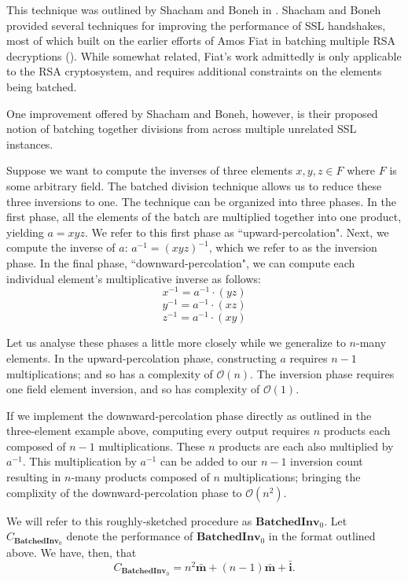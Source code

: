 This technique was outlined by Shacham and Boneh in \cite{batching}. Shacham and Boneh provided several techniques for improving the performance of SSL handshakes, most of which built on the earlier efforts of Amos Fiat in batching multiple RSA decryptions (\cite{RSAbatch}). While somewhat related, Fiat's work admittedly is only applicable to the RSA cryptosystem, and requires additional constraints on the elements being batched. 

One improvement offered by Shacham and Boneh, however, is their proposed notion of batching together divisions from across multiple unrelated SSL instances. 

Suppose we want to compute the inverses of three elements $x, y, z \in F$ where $F$ is some arbitrary field. The batched division technique allows us to reduce these three inversions to one. The technique can be organized into three phases. In the first phase, all the elements of the batch are multiplied together into one product, yielding $a = xyz$. We refer to this first phase as ``upward-percolation". Next, we compute the inverse of $a$: $a^{-1} = (xyz)^{-1}$, which we refer to as the inversion phase. In the final phase, ``downward-percolation", we can compute each individual element's multiplicative inverse as follows:
$$
x^{-1} = a^{-1} \cdot (yz)
$$
$$
y^{-1} = a^{-1} \cdot (xz)
$$
$$
z^{-1} = a^{-1} \cdot (xy)
$$

Let us analyse these phases a little more closely while we generalize to $n$-many elements. In the upward-percolation phase, constructing $a$ requires $n-1$ multiplications; and so has a complexity of $\mathcal{O}(n)$. The inversion phase requires one field element inversion, and so has complexity of $\mathcal{O}(1)$. 

If we implement the downward-percolation phase directly as outlined in the three-element example above, computing every output requires $n$ products each composed of $n-1$ multiplications. These $n$ products are each also multiplied by $a^{-1}$. This multiplication by $a^{-1}$ can be added to our $n-1$ inversion count resulting in $n$-many products composed of $n$ multiplications; bringing the complixity of the downward-percolation phase to $\mathcal{O}(n^2)$.

We will refer to this roughly-sketched procedure as $\textbf{BatchedInv}_0$. Let $C_{\textbf{BatchedInv}_0}$ denote the performance of $\textbf{BatchedInv}_0$ in the format outlined above. We have, then, that 
$$
C_{\textbf{BatchedInv}_0} = n^2\bar{\textbf{m}} + (n-1)\bar{\textbf{m}} + \bar{\textbf{i}}.
$$

